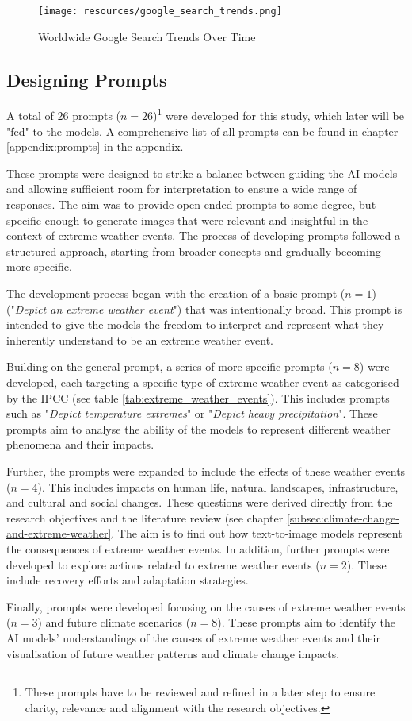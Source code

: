 \begin{figure}[h]
    \centering
    \texttt{[image: resources/google\_search\_trends.png]}
    \caption{Worldwide Google Search Trends Over Time}
    \label{fig:google_search_trends}
\end{figure}

\subsection{Designing Prompts}

A total of 26 prompts ($n=26$)\footnote{These prompts have to be reviewed and refined in a later step to ensure clarity, relevance and alignment with the research objectives. } were developed for this study, which later will be "fed" to the models. A comprehensive list of all prompts can be found in chapter \ref{appendix:prompts} in the appendix.

These prompts were designed to strike a balance between guiding the AI models and allowing sufficient room for interpretation to ensure a wide range of responses. The aim was to provide open-ended prompts to some degree, but specific enough to generate images that were relevant and insightful in the context of extreme weather events. The process of developing prompts followed a structured approach, starting from broader concepts and gradually becoming more specific.

The development process began with the creation of a basic prompt  ($n=1$) ("\textit{Depict an extreme weather event}") that was intentionally broad. This prompt is intended to give the models the freedom to interpret and represent what they inherently understand to be an extreme weather event.

Building on the general prompt, a series of more specific prompts ($n=8$) were developed, each targeting a specific type of extreme weather event as categorised by the IPCC (see table \ref{tab:extreme_weather_events}). This includes prompts such as "\textit{Depict temperature extremes}" or "\textit{Depict heavy precipitation}". These prompts aim to analyse the ability of the models to represent different weather phenomena and their impacts.

Further, the prompts were expanded to include the effects of these weather events ($n=4$). This includes impacts on human life, natural landscapes, infrastructure, and cultural and social changes. These questions were derived directly from the research objectives and the literature review (see chapter \ref{subsec:climate-change-and-extreme-weather}. The aim is to find out how text-to-image models represent the consequences of extreme weather events. In addition, further prompts were developed to explore actions related to extreme weather events ($n=2$). These include recovery efforts and adaptation strategies.

Finally, prompts were developed focusing on the causes of extreme weather events ($n=3$) and future climate scenarios ($n=8$). These prompts aim to identify the AI models' understandings of the causes of extreme weather events and their visualisation of future weather patterns and climate change impacts.

